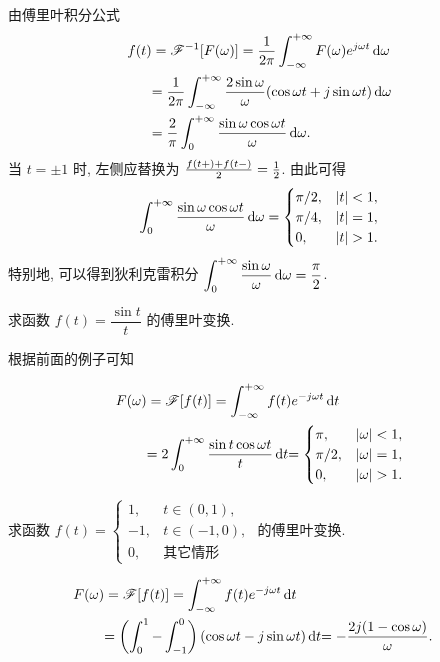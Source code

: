 由傅里叶积分公式
\begin{align*}
	f(t)&=\mathscr{F}^{-1}[F(\omega)]=\frac1{2\pi}\int_{-\infty}^{+\infty}F(\omega)e^{j\omega t}\,\mathrm{d}\omega\\
	&{=\frac1{2\pi}\int_{-\infty}^{+\infty}\frac{2\sin\omega}{\omega}(\cos\omega t+j\sin\omega t)\,\mathrm{d} \omega}\\
	&{=\frac2\pi\int_0^{+\infty}\frac{\sin\omega\cos\omega t}{\omega}\,\mathrm{d} \omega.}
\end{align*}
当 $t=\pm1$ 时, 左侧应替换为 $\frac{f(t+)+f(t-)}2=\frac{1}{2} $.
由此可得
\[\int_0^{+\infty}\frac{\sin \omega\cos\omega t}\omega\diff\omega=\begin{cases}
	\pi/2,&|t|<1,\\
	\pi/4,&|t|=1,\\
	0,&|t|>1.
\end{cases}\]
特别地, 可以得到狄利克雷积分
$\displaystyle\int_0^{+\infty}\frac{\sin\omega}\omega\,\mathrm{d}\omega=\frac\pi2$.

\begin{example}
	求函数 $f(t)=\dfrac{\sin t}{t}$ 的傅里叶变换.
\end{example}

\begin{solution}
	根据前面的例子可知

	\begin{align*}
		F(\omega)&=\msf[f(t)]=\int_{-\infty}^{+\infty}f(t)e^{-j\omega t}\diff t\\
		&{=2\int_0^{+\infty}\frac{\sin t\cos\omega t}{t}\diff t}
		{=\begin{cases}
			\pi,&|\omega|<1,\\
			\pi/2,&|\omega|=1,\\
			0,&|\omega|>1.
			\end{cases}}
	\end{align*}
\end{solution}

\begin{example}
	求函数 $f(t)=
		\begin{cases}
			1,&t\in(0,1),\\
			-1,&t\in(-1,0),\\
			0,&\text{其它情形}
		\end{cases}$
	的傅里叶变换.
\end{example}

\begin{solution}

	\begin{align*}
		F(\omega)&=\mathscr{F}[f(t)]=\int_{-\infty}^{+\infty}f(t)e^{-j\omega t}\,\mathrm{d} t\\
		&{=\left(\int_0^1-\int_{-1}^0\right)(\cos\omega t-j\sin\omega t)\,\mathrm{d} t}
		{=-\frac{2j(1-\cos\omega)}\omega.}&{}
	\end{align*}
\end{solution}

